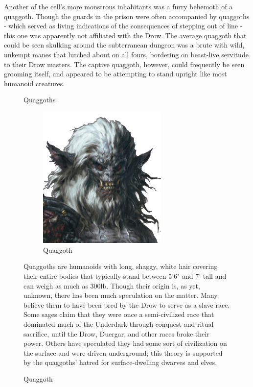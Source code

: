 \documentclass[letterpaper,10pt,twoside,twocolumn,openany]{book}
\begin{document}
Another of the cell's more monstrous inhabitants was a furry behemoth of a quaggoth. Though the guards in the prison were often accompanied by quaggoths - which served as living indications of the consequences of stepping out of line - this one was apparently not affiliated with the Drow. The average quaggoth that could be seen skulking around the subterranean dungeon was a brute with wild, unkempt manes that lurched about on all fours, bordering on beast-live servitude to their Drow masters. The captive quaggoth, however, could frequently be seen grooming itself, and appeared to be attempting to stand upright like most humanoid creatures.

\begin{figure}[h]
	\begin{paperbox}{Quaggoths}
		\begin{figure}[H]
			\centering
			\includegraphics[width=0.7\textwidth]{img/dist/quaggoth.png}
			\caption{Quaggoth\label{fig:quaggoth}}
		\end{figure}
		Quaggoths are humanoids with long, shaggy, white hair covering their entire bodies that typically stand between 5'6" and 7' tall and can weigh as much as 300lb. Though their origin is, as yet, unknown, there has been much speculation on the matter. Many believe them to have been bred by the Drow to serve as a slave race. Some sages claim that they were once a semi-civilized race that dominated much of the Underdark through conquest and ritual sacrifice, until the Drow, Duergar, and other races broke their power. Others have speculated they had some sort of civilization on the surface and were driven underground; this theory is supported by the quaggoths' hatred for surface-dwelling dwarves and elves.
	\end{paperbox}
\end{figure}
\end{document}
